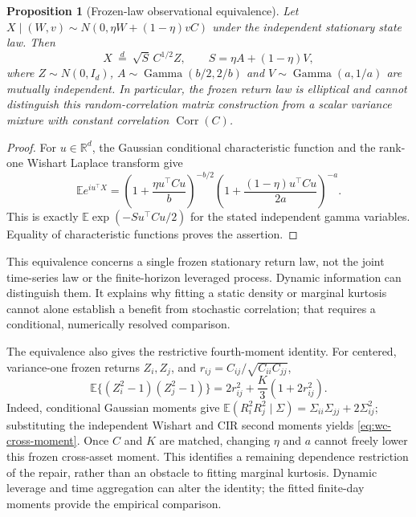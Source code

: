 \documentclass[11pt]{article}
\newtheorem{proposition}[theorem]{Proposition}
\theoremstyle{definition}\newtheorem{definition}[theorem]{Definition}
\theoremstyle{remark}\newtheorem{remark}[theorem]{Remark}
\newcommand{\E}{\mathbb E}\newcommand{\Prob}{\mathbb P}\newcommand{\R}{\mathbb R}
\begin{document}
\begin{proposition}[Frozen-law observational equivalence]\label{prop:wc-equivalence}
Let $X\mid(W,v)\sim N(0,\eta W+(1-\eta)vC)$ under the independent stationary state law. Then
\[
 X\ \overset{d}=\ \sqrt S\,C^{1/2}Z,\qquad
 S=\eta A+(1-\eta)V,
\]
where $Z\sim N(0,I_d)$, $A\sim\operatorname{Gamma}(b/2,2/b)$ and $V\sim\operatorname{Gamma}(a,1/a)$ are mutually independent. In particular, the frozen return law is elliptical and cannot distinguish this random-correlation matrix construction from a scalar variance mixture with constant correlation $\operatorname{Corr}(C)$.
\end{proposition}
\begin{proof}
For $u\in\R^d$, the Gaussian conditional characteristic function and the rank-one Wishart Laplace transform give
\[
 \E e^{iu^\top X}
 =\left(1+\frac{\eta u^\top Cu}{b}\right)^{-b/2}
  \left(1+\frac{(1-\eta)u^\top Cu}{2a}\right)^{-a}.
\]
This is exactly $\E\exp(-S u^\top Cu/2)$ for the stated independent gamma variables. Equality of characteristic functions proves the assertion.
\end{proof}
This equivalence concerns a single frozen stationary return law, not the joint time-series law or the finite-horizon leveraged process. Dynamic information can distinguish them. It explains why fitting a static density or marginal kurtosis cannot alone establish a benefit from stochastic correlation; that requires a conditional, numerically resolved comparison.

The equivalence also gives the restrictive fourth-moment identity. For centered, variance-one frozen returns $Z_i,Z_j$, and $r_{ij}=C_{ij}/\sqrt{C_{ii}C_{jj}}$,
\begin{equation}\label{eq:wc-cross-moment}
 \E\{(Z_i^2-1)(Z_j^2-1)\}
 =2r_{ij}^2+\frac K3(1+2r_{ij}^2).
\end{equation}
Indeed, conditional Gaussian moments give $\E(R_i^2R_j^2\mid\Sigma)=\Sigma_{ii}\Sigma_{jj}+2\Sigma_{ij}^2$; substituting the independent Wishart and CIR second moments yields \eqref{eq:wc-cross-moment}. Once $C$ and $K$ are matched, changing $\eta$ and $a$ cannot freely lower this frozen cross-asset moment. This identifies a remaining dependence restriction of the repair, rather than an obstacle to fitting marginal kurtosis. Dynamic leverage and time aggregation can alter the identity; the fitted finite-day moments provide the empirical comparison.
\end{document}
